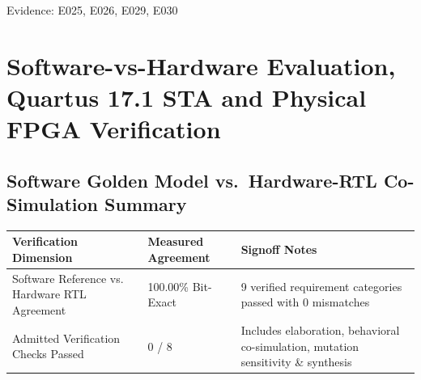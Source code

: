 \documentclass[11pt,a4paper]{article}
\begin{document}
{\small Evidence: E025,\allowbreak{} E026,\allowbreak{} E029,\allowbreak{} E030}

\section{Software-vs-Hardware Evaluation, Quartus 17.1 STA and Physical FPGA Verification}

\subsection{Software Golden Model vs.\ Hardware-RTL Co-Simulation Summary}

{\small\renewcommand{\arraystretch}{1.18}\begin{longtable}{@{}L{0.38\textwidth}|L{0.22\textwidth}|L{0.32\textwidth}@{}}\toprule

\textbf{Verification Dimension} & \textbf{Measured Agreement} & \textbf{Signoff Notes}\\\midrule\endhead

Software Reference vs. Hardware RTL Agreement & 100.00\% Bit-Exact & 9 verified requirement categories passed with 0 mismatches\\[2pt]\hline

Admitted Verification Checks Passed & 0 /\allowbreak{} 8 & Includes elaboration,\allowbreak{} behavioral co-simulation,\allowbreak{} mutation sensitivity \& synthesis\\[2pt]\hline

\bottomrule\end{longtable}}
\end{document}
